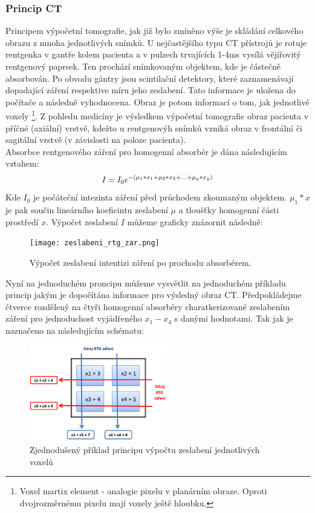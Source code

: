 \documentclass{thesis}%
\begin{document}
\subsubsection{Princip CT}
Principem výpočetní tomografie, jak již bylo zmíněno výše je skládání celkového obrazu z mnoha jednotlivých snímků. U nejčastějšího typu CT přístrojů je rotuje rentgenka v gantře kolem pacienta a v pulzech trvajících 1-4ms vysílá vějířovitý rentgenový paprsek. Ten prochází snímkovaným objektem, kde je částečně absorbován. Po obvodu gántry jsou scintilační detektory, které zaznamenávají dopadající záření respektive míru jeho zeslabení. Tato informace je uložena do počítače a následně vyhodnocena. Obraz je potom informací o tom, jak jednotlivé voxely \footnote[3]{Voxel martix element - analogie pixelu v planárním obraze. Oproti dvojrozměrnému pixelu mají voxely ještě hloubku.}. Z pohledu medicíny je výsledkem výpočetní tomografie obraz pacienta v příčné (axiální) vrstvě, kdežto u rentgenovýh snímků vzniká obraz v frontální či sagitální vrstvě (v závislosti na poloze pacienta).\\
Absorbce rentgenového záření pro homogenní absorbér je dána následujícím vztahem:
\begin{equation}
 \centering
	I = I_{0}e^{-( \mu_{1}*x_{1} + \mu_{2}*x_{2} + ... + \mu_{y}*x_{y})}	
\end{equation}
Kde $ I_{0}$ je počáteční intezinta záření před průchodem zkoumaným objektem. $ \mu_{1}*x$ je pak součin lineárního koeficintu zeslabení $\mu$ a tloušťky homogenní části prostředí $x$. Výpočet zeslabení $I$ můžeme graficky znázornit následně:
\begin{figure}[h!]
 \centering
	\texttt{[image: zeslabeni\_rtg\_zar.png]}
	\caption[Výpočet absorbce]{Výpočet zeslabení intentizi záření po prochodu absorbérem.}
\end{figure}
Nyní na jednoduchém proncipu můžeme vysvětlit na jednoduchém příkladu princip jakým je dopočítána informace pro výsledný obraz CT. Předpokládejme čtverce rozdělený na čtyři homogenní absorbéry charatkerizované zeslabením záření pro jednoduchost vyjádřeného $x_{1} - x_{4} $ s danými hodnotami. Tak jak je naznačeno na následujícím schématu:
\begin{figure}[h!]
 \centering
	\includegraphics[width=6cm]{princip_CT.png}
	\caption[Princip výpočtu zeslabení voxelů]{Zjednodušený příklad principu výpočtu zeslabení jednotlivých voxelů}
\end{figure}
\end{document}
